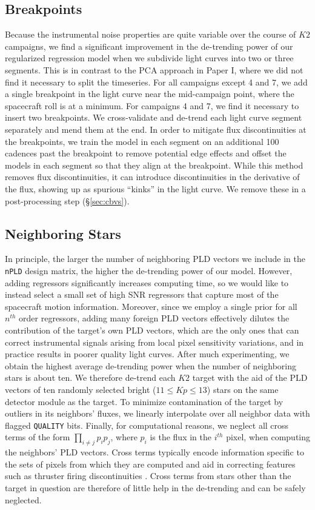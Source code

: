 \documentclass[]{emulateapj}
\newcommand{\Kp}{\ensuremath{Kp}}
\begin{document}
\subsection{Breakpoints}
\label{sec:impl_breakpoints}
Because the instrumental noise properties are quite variable over the course of $K2$
campaigns, we find a significant improvement in the de-trending power of our regularized
regression model when we subdivide light curves into two or three segments. This is in contrast to
the PCA approach in Paper I, where we did not find it necessary to split the timeseries.
For all campaigns except 4 and 7, we add a single breakpoint in the light curve near the
mid-campaign point, where the spacecraft roll is at a minimum. For campaigns 4 and 7,
we find it necessary to insert two breakpoints. We cross-validate and de-trend each
light curve segment separately and mend them at the end. In order to mitigate flux
discontinuities at the breakpoints, we train the model in each segment on an additional
100 cadences past the breakpoint to remove potential edge effects and offset the models
in each segment so that they align at the breakpoint.
While this method removes flux discontinuities, it can introduce discontinuities in the
derivative of the flux, showing up as spurious ``kinks'' in the light curve. We
remove these in a post-processing step (\S\ref{sec:cbvs}).

\subsection{Neighboring Stars}
\label{sec:impl_neighboring}
In principle, the larger the number of neighboring PLD vectors we include in the
\texttt{nPLD} design matrix, the higher the de-trending power of our model. However, adding
regressors significantly increases computing time, so we would like to instead select
a small set of high SNR regressors that capture most of the spacecraft
motion information. Moreover, since we employ a single prior for all $n^{th}$ order
regressors, adding many foreign PLD vectors effectively dilutes the contribution of
the target's own PLD vectors, which are the only ones that can correct instrumental
signals arising from local pixel sensitivity variations, and in practice results
in poorer quality light curves. After much experimenting, we obtain the highest average
de-trending power when the number of neighboring stars is about ten. We therefore de-trend
each $K2$ target with the aid of the PLD vectors of ten randomly selected bright
($11 \leq \Kp \leq 13$) stars on the same detector module as the target. To minimize
contamination of the target by outliers in its neighbors' fluxes, we linearly
interpolate over all neighbor data with flagged \texttt{QUALITY} bits. Finally, for
computational reasons, we neglect all cross terms of the form $\prod_{i \neq j} p_i p_j$,
where $p_i$ is the flux in the $i^{th}$ pixel,
when computing the neighbors' PLD vectors. Cross terms typically encode information
specific to the sets of pixels from which they are computed and aid in correcting
features such as thruster firing discontinuities \citep{Luger16}. Cross terms from
stars other than the target in question are therefore of little help in the de-trending
and can be safely neglected.
\end{document}
